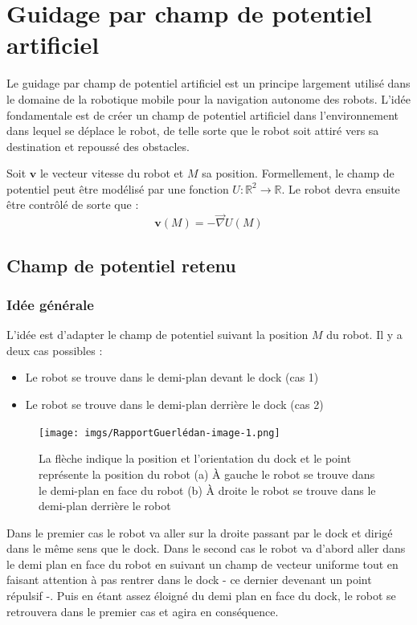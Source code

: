\documentclass[12pt]{report}
\begin{document}
\section{Guidage par champ de potentiel artificiel}

Le guidage par champ de potentiel artificiel est un principe largement utilisé dans le domaine de la robotique mobile pour la navigation autonome des robots. L'idée fondamentale est de créer un champ de potentiel artificiel dans l'environnement dans lequel se déplace le robot, de telle sorte que le robot soit attiré vers sa destination et repoussé des obstacles.

Soit $\mathbf{v}$ le vecteur vitesse du robot et $M$ sa position. Formellement, le champ de potentiel peut être modélisé par une fonction $U : \mathbb{R}^2 \rightarrow \mathbb{R}$. Le robot devra ensuite être contrôlé de sorte que :
\[ \mathbf{v} (M) = - \vec{\nabla} U (M) \]

\subsection{Champ de potentiel retenu}

\subsubsection{Idée générale}

L'idée est d'adapter le champ de potentiel suivant la position $M$ du robot. Il y a deux cas possibles :
\begin{itemize}
  \item Le robot se trouve dans le demi-plan devant le dock (cas 1)
  
  \item Le robot se trouve dans le demi-plan derrière le dock (cas 2)
\end{itemize}
\begin{figure}[!h]
  \centering
  \texttt{[image: imgs/RapportGuerlédan-image-1.png]}
  \caption{La flèche indique la position et l'orientation du dock et le point représente la position du robot (a) À gauche le robot se trouve dans le demi-plan en face du robot (b) À droite le robot se trouve dans le demi-plan derrière le robot}
\end{figure}

Dans le premier cas le robot va aller sur la droite passant par le dock et dirigé dans le même sens que le dock. Dans le second cas le robot va d'abord aller dans le demi plan en face du robot en suivant un champ de vecteur uniforme tout en faisant attention à pas rentrer dans le dock - ce dernier devenant un point répulsif -. Puis en étant assez éloigné du demi plan en face du dock, le robot se retrouvera dans le premier cas et agira en conséquence.
\end{document}
